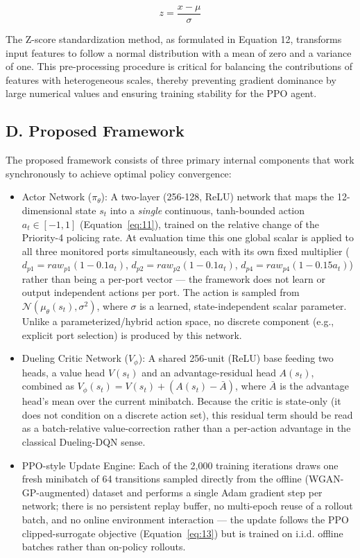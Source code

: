 \documentclass[conference]{IEEEtran}
\begin{document}
\begin{equation}\label{eq:12}
z = \frac{x - \mu}{\sigma}
\end{equation}

The Z-score standardization method, as formulated in Equation 12, transforms input features to follow a normal distribution with a mean of zero and a variance of one. This pre-processing procedure is critical for balancing the contributions of features with heterogeneous scales, thereby preventing gradient dominance by large numerical values and ensuring training stability for the PPO agent.

\subsection{D. Proposed Framework}\label{d.-proposed-framework}

The proposed framework consists of three primary internal components that work synchronously to achieve optimal policy convergence:

\begin{itemize}
\item
  Actor Network (\(\pi_{\theta}\)): A two-layer (256-128, ReLU) network that maps the 12-dimensional state \(s_{t}\) into a \emph{single} continuous, tanh-bounded action \(a_{t} \in [-1,1]\) (Equation~\ref{eq:11}), trained on the relative change of the Priority-4 policing rate. At evaluation time this one global scalar is applied to all three monitored ports simultaneously, each with its own fixed multiplier (\(d_{p1}=raw_{p1}(1-0.1a_t)\), \(d_{p2}=raw_{p2}(1-0.1a_t)\), \(d_{p4}=raw_{p4}(1-0.15a_t)\)) rather than being a per-port vector --- the framework does not learn or output independent actions per port. The action is sampled from \(\mathcal{N}(\mu_\theta(s_t), \sigma^2)\), where \(\sigma\) is a learned, state-independent scalar parameter. Unlike a parameterized/hybrid action space, no discrete component (e.g., explicit port selection) is produced by this network.
\item
  Dueling Critic Network (\(V_{\phi}\)): A shared 256-unit (ReLU) base feeding two heads, a value head \(V(s_t)\) and an advantage-residual head \(A(s_t)\), combined as \(V_\phi(s_t) = V(s_t) + \left(A(s_t) - \bar{A}\right)\), where \(\bar{A}\) is the advantage head's mean over the current minibatch. Because the critic is state-only (it does not condition on a discrete action set), this residual term should be read as a batch-relative value-correction rather than a per-action advantage in the classical Dueling-DQN sense.
\item
  PPO-style Update Engine: Each of the 2,000 training iterations draws one fresh minibatch of 64 transitions sampled directly from the offline (WGAN-GP-augmented) dataset and performs a single Adam gradient step per network; there is no persistent replay buffer, no multi-epoch reuse of a rollout batch, and no online environment interaction --- the update follows the PPO clipped-surrogate objective (Equation~\ref{eq:13}) but is trained on i.i.d. offline batches rather than on-policy rollouts.
\end{itemize}
\end{document}
